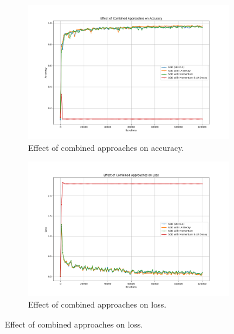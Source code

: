\documentclass{article}
\begin{document}
\begin{figure}[H]
    \centering
    \begin{subfigure}[t]{0.48\textwidth}
        \vspace{0pt}%
        \centering
        \includegraphics[width=1.1\textwidth]{plots/part2d_combined_accuracy.png}
        \caption{Effect of combined approaches on accuracy.}
        \label{fig:combined_accuracy}
    \end{subfigure}
    \hfill
    \begin{subfigure}[t]{0.48\textwidth}
        \vspace{0pt}%
        \centering
        \includegraphics[width=1.1\textwidth]{plots/part2d_combined_loss.png}
        \caption{Effect of combined approaches on loss.}
        \label{fig:combined_loss}
    \end{subfigure}
\end{figure}
\end{document}

